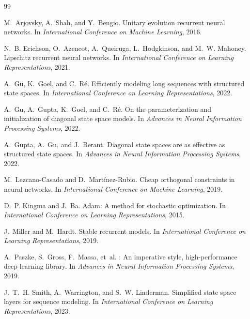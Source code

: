 \documentclass{article}
\theoremstyle{definition}
\begin{document}
\begin{thebibliography}{99}

M.~Arjovsky, A.~Shah, and Y.~Bengio.
\newblock Unitary evolution recurrent neural networks.
\newblock In {\em International Conference on Machine Learning}, 2016.

N.~B. Erichson, O.~Azencot, A.~Queiruga, L.~Hodgkinson, and M.~W. Mahoney.
\newblock Lipschitz recurrent neural networks.
\newblock In {\em International Conference on Learning Representations}, 2021.

A.~Gu, K.~Goel, and C.~R\'e.
\newblock Efficiently modeling long sequences with structured state spaces.
\newblock In {\em International Conference on Learning Representations}, 2022.

A.~Gu, A.~Gupta, K.~Goel, and C.~R\'e.
\newblock On the parameterization and initialization of diagonal state space
  models.
\newblock In {\em Advances in Neural Information Processing Systems}, 2022.

A.~Gupta, A.~Gu, and J.~Berant.
\newblock Diagonal state spaces are as effective as structured state spaces.
\newblock In {\em Advances in Neural Information Processing Systems}, 2022.

M.~Lezcano-Casado and D.~Mart\'inez-Rubio.
\newblock Cheap orthogonal constraints in neural networks.
\newblock In {\em International Conference on Machine Learning}, 2019.

D.~P. Kingma and J.~Ba.
\newblock Adam: A method for stochastic optimization.
\newblock In {\em International Conference on Learning Representations}, 2015.

J.~Miller and M.~Hardt.
\newblock Stable recurrent models.
\newblock In {\em International Conference on Learning Representations}, 2019.

A.~Paszke, S.~Gross, F.~Massa, et~al.
: An imperative style, high-performance deep learning library.
\newblock In {\em Advances in Neural Information Processing Systems}, 2019.

J.~T.~H. Smith, A.~Warrington, and S.~W. Linderman.
\newblock Simplified state space layers for sequence modeling.
\newblock In {\em International Conference on Learning Representations}, 2023.

\end{thebibliography}
\end{document}
